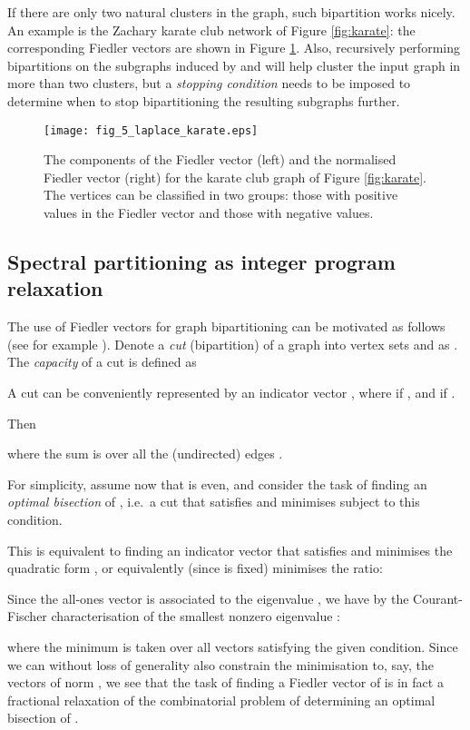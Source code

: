 \documentclass{article}
\begin{document}
If there are only two natural clusters in the graph, such bipartition
works nicely. An example is the Zachary karate club network of Figure
\ref{fig:karate}: the corresponding Fiedler vectors are shown in
Figure \ref{fig:lapkarate}. Also, recursively performing bipartitions
on the subgraphs induced by  and  will help cluster
the input graph  in more than two clusters, but a \emph{stopping
  condition} needs to be imposed to determine when to stop
bipartitioning the resulting subgraphs further.

\begin{figure}
\centerline{\texttt{[image: fig\_5\_laplace\_karate.eps]}}
\caption{The components of the Fiedler vector (left) and the
  normalised Fiedler vector (right) for the karate club graph of Figure
  \ref{fig:karate}. The vertices can be classified in two groups:
  those with positive values in the Fiedler vector and those with
  negative values.}
\label{fig:lapkarate}
\end{figure}



\subsection{Spectral partitioning as integer program relaxation}

The use of Fiedler vectors for graph bipartitioning can be motivated
as follows (see for example \cite{HKK07}). Denote a \emph{cut}
(bipartition) of a graph  into vertex sets  and  as .  The {\em capacity} of a cut  is
defined as

A cut  can be conveniently represented by an indicator vector
, where  if , and 
if . 

Then

where the sum is over all the (undirected) edges .

For simplicity, assume now that  is even, and
consider the task of finding an {\em optimal bisection} of ,
i.e.\ a cut  that satisfies 
and minimises  subject to this condition.

This is equivalent to finding an indicator vector
 that satisfies  and
minimises the quadratic form ,
or equivalently (since  is fixed) minimises the ratio:

Since the all-ones vector  is associated to the
eigenvalue , we have by the
Courant-Fischer characterisation of the smallest
nonzero eigenvalue :

where the minimum is taken over all vectors 
satisfying the given condition. Since we can without
loss of generality also constrain the minimisation to,
say, the vectors of norm , we see that
the task of finding a Fiedler vector of  is in fact
a fractional relaxation of the combinatorial problem of
determining an optimal bisection of .
\end{document}
